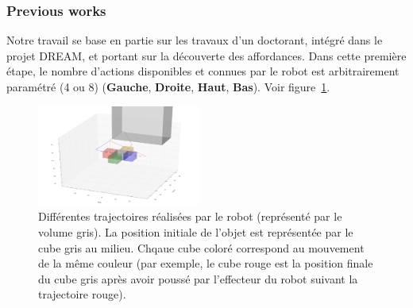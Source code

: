 \documentclass{llncs}
\begin{document}
\subsubsection{Previous works}

Notre travail se base en partie sur les travaux d'un doctorant, intégré dans le projet DREAM, et portant sur la découverte des affordances. Dans cette première étape, le nombre d'actions disponibles et connues par le robot est arbitrairement paramétré (4 ou 8) (\textbf{Gauche}, \textbf{Droite}, \textbf{Haut}, \textbf{Bas}). Voir figure~\ref{fig:trajectories}.



\begin{figure}
  \begin{center}
    \includegraphics[width=0.48\textwidth]{figures/trajectories}
  \end{center}
  \caption{Différentes trajectoires réalisées par le robot (représenté par le volume gris). La position initiale de l'objet est représentée par le cube gris au milieu. Chqaue cube coloré correspond au mouvement de la même couleur (par exemple, le cube rouge est la position finale du cube gris après avoir poussé par l'effecteur du robot suivant la trajectoire rouge).}
  \label{fig:trajectories}
\end{figure}
\end{document}

